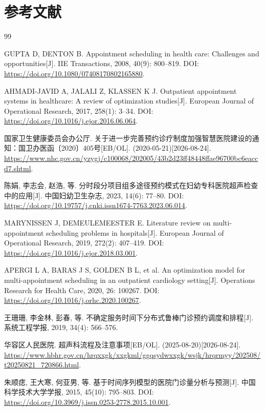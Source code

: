 \section{参考文献}
\begingroup
\renewcommand{\refname}{参考文献}
\songti
\setlength{\itemsep}{3pt}
\begin{thebibliography}{99}

GUPTA D, DENTON B. Appointment scheduling in health care: Challenges and opportunities[J]. IIE Transactions, 2008, 40(9): 800--819. DOI: \url{https://doi.org/10.1080/07408170802165880}.

AHMADI-JAVID A, JALALI Z, KLASSEN K J. Outpatient appointment systems in healthcare: A review of optimization studies[J]. European Journal of Operational Research, 2017, 258(1): 3--34. DOI: \url{https://doi.org/10.1016/j.ejor.2016.06.064}.

国家卫生健康委员会办公厅. 关于进一步完善预约诊疗制度加强智慧医院建设的通知：国卫办医函〔2020〕405号[EB/OL]. (2020-05-21)[2026-08-24]. \url{https://www.nhc.gov.cn/yzygj/c100068/202005/43b2d23ff48448ffae96700bc6eaccd7.shtml}.

陈娟, 李志会, 赵浩, 等. 分时段分项目组多途径预约模式在妇幼专科医院超声检查中的应用[J]. 中国妇幼卫生杂志, 2023, 14(6): 77--80. DOI: \url{https://doi.org/10.19757/j.cnki.issn1674-7763.2023.06.014}.

MARYNISSEN J, DEMEULEMEESTER E. Literature review on multi-appointment scheduling problems in hospitals[J]. European Journal of Operational Research, 2019, 272(2): 407--419. DOI: \url{https://doi.org/10.1016/j.ejor.2018.03.001}.

APERGI L A, BARAS J S, GOLDEN B L, et al. An optimization model for multi-appointment scheduling in an outpatient cardiology setting[J]. Operations Research for Health Care, 2020, 26: 100267. DOI: \url{https://doi.org/10.1016/j.orhc.2020.100267}.

王珊珊, 李金林, 彭春, 等. 不确定服务时间下分布式鲁棒门诊预约调度和排程[J]. 系统工程学报, 2019, 34(4): 566--576.

华容区人民医院. 超声科流程及注意事项[EB/OL]. (2025-08-20)[2026-08-24]. \url{https://www.hbhr.gov.cn/hrqxxgk/xxgkml/ggqsydwxxgk/wsjk/hrqrmyy/202508/t20250821_720866.html}.

朱顺痣, 王大寒, 何亚男, 等. 基于时间序列模型的医院门诊量分析与预测[J]. 中国科学技术大学学报, 2015, 45(10): 795--803. DOI: \url{https://doi.org/10.3969/j.issn.0253-2778.2015.10.001}.


\end{thebibliography}
